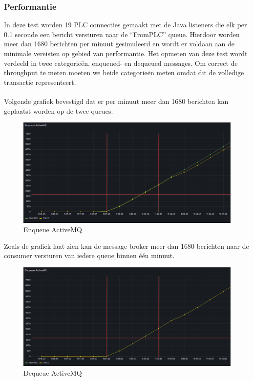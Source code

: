 \subsubsection{Performantie}
In deze test worden 19 PLC connecties gemaakt met de Java listeners die elk per 0.1 seconde een bericht versturen naar de  ``FromPLC'' queue.
Hierdoor worden meer dan 1680 berichten per minuut gesimuleerd en wordt er voldaan aan de minimale vereisten op gebied van performantie.
Het opmeten van deze test wordt verdeeld in twee categorieën, enqueued- en dequeued messages.
Om correct de throughput te meten moeten we beide categorieën meten omdat dit de volledige transactie representeert. 
\\\\
Volgende grafiek bevestigd dat er per minuut meer dan 1680 berichten kan geplaatst worden op de twee queues:
\begin{figure}[h!]
  \centering
  \includegraphics[width=.95\textwidth]{img/amq-enqueue-count.png}
  \caption{\label{fig:amq_enqueue_count}Enqueue ActiveMQ}
\end{figure}
\newpage
Zoals de grafiek laat zien kan de message broker meer dan 1680 berichten naar de consumer versturen van iedere queue binnen één minuut.
\begin{figure}[h!]
  \centering
  \includegraphics[width=.95\textwidth]{img/amq-dequeue-count.png}
  \caption{\label{fig:amq_dequeue_count}Dequeue ActiveMQ}
\end{figure}

